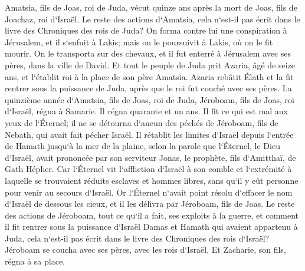 \verse Amatsia, fils de Joas, roi de Juda, vécut quinze ans après la mort de Joas, fils de Joachaz, roi d`Israël. 
\verse Le reste des actions d`Amatsia, cela n`est-il pas écrit dans le livre des Chroniques des rois de Juda? 
\verse On forma contre lui une conspiration à Jérusalem, et il s`enfuit à Lakis; mais on le poursuivit à Lakis, où on le fit mourir. 
\verse On le transporta sur des chevaux, et il fut enterré à Jérusalem avec ses pères, dans la ville de David. 
\verse Et tout le peuple de Juda prit Azaria, âgé de seize ans, et l`établit roi à la place de son père Amatsia. 
\verse Azaria rebâtit Élath et la fit rentrer sous la puissance de Juda, après que le roi fut couché avec ses pères. 
\verse La quinzième année d`Amatsia, fils de Joas, roi de Juda, Jéroboam, fils de Joas, roi d`Israël, régna à Samarie. Il régna quarante et un ans. 
\verse Il fit ce qui est mal aux yeux de l`Éternel; il ne se détourna d`aucun des péchés de Jéroboam, fils de Nebath, qui avait fait pécher Israël. 
\verse Il rétablit les limites d`Israël depuis l`entrée de Hamath jusqu`à la mer de la plaine, selon la parole que l`Éternel, le Dieu d`Israël, avait prononcée par son serviteur Jonas, le prophète, fils d`Amitthaï, de Gath Hépher. 
\verse Car l`Éternel vit l`affliction d`Israël à son comble et l`extrémité à laquelle se trouvaient réduits esclaves et hommes libres, sans qu`il y eût personne pour venir au secours d`Israël. 
\verse Or l`Éternel n`avait point résolu d`effacer le nom d`Israël de dessous les cieux, et il les délivra par Jéroboam, fils de Joas. 
\verse Le reste des actions de Jéroboam, tout ce qu`il a fait, ses exploits à la guerre, et comment il fit rentrer sous la puissance d`Israël Damas et Hamath qui avaient appartenu à Juda, cela n`est-il pas écrit dans le livre des Chroniques des rois d`Israël? 
\verse Jéroboam se coucha avec ses pères, avec les rois d`Israël. Et Zacharie, son fils, régna à sa place. 

\chapter{}

